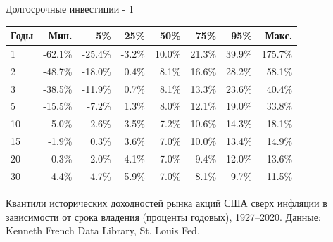 \documentclass{beamer}
\begin{document}
\begin{frame}{Долгосрочные инвестиции - 1}
\centering
\small
\begin{tabular}{l|r|r|r|r|r|r|r}
Годы & Мин.    &     5\% &   25\% &   50\% &   75\% &   95\% & Макс. \\ \hline
1    & -62.1\% & -25.4\% & -3.2\% & 10.0\% & 21.3\% & 39.9\% & 175.7\% \\
2    & -48.7\% & -18.0\% &  0.4\% &  8.1\% & 16.6\% & 28.2\% &  58.1\% \\
3    & -38.5\% & -11.9\% &  0.7\% &  8.1\% & 13.3\% & 23.6\% &  40.4\% \\ 
5    & -15.5\% &  -7.2\% &  1.3\% &  8.0\% & 12.1\% & 19.0\% &  33.8\% \\
10   &  -5.0\% &  -2.6\% &  3.5\% &  7.2\% & 10.6\% & 14.3\% &  18.1\% \\
15   &  -1.9\% &   0.3\% &  3.6\% &  7.0\% & 10.0\% & 13.4\% &  14.9\% \\
20   &   0.3\% &   2.0\% &  4.1\% &  7.0\% &  9.4\% & 12.0\% &  13.6\% \\
30   &   4.4\% &   4.7\% &  5.9\% &  7.0\% &  8.1\% &  9.7\% &  11.5\% 
\end{tabular}

\justify
Квантили исторических доходностей рынка акций США сверх инфляции в зависимости 
от срока владения (проценты годовых), 1927--2020. Данные: Kenneth French Data 
Library, St. Louis  Fed.
\end{frame}



\newcommand{\addQuantilePlot}[3] {
    \addplot[
        color=#2,
        style=#3,
        thick
    ] 
    table [
        x=holding_period,
        y=#1,
        col sep=comma
    ]
    {data/us_mkt_holding_periods.csv};
}
\end{document}
